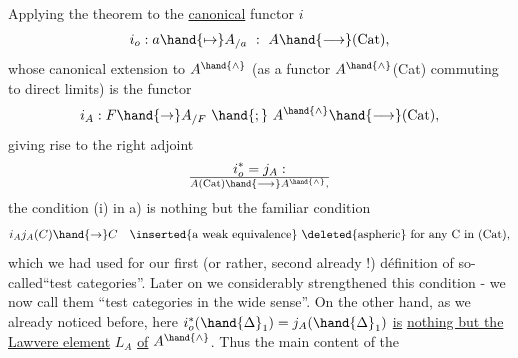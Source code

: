 Applying the theorem to the \uline{canonical} functor $i$
\[ i_o : a \hand{\ensuremath{\mapsto}} A_{/a} \ : \ A \hand{\ensuremath{\longrightarrow}} \text{(Cat)} , \]
whose canonical extension to $A^{\hand{\wedge}}$ (as a functor $A^{\hand{\wedge}}$\hand{\ensuremath{\to}}(Cat) commuting to
direct limits) is the functor 
\[ i_A : F \hand{\ensuremath{\to}} A_{/F} \ \hand{;} \ A^{\hand{\wedge}} \hand{\ensuremath{\longrightarrow}} \text{(Cat)} , \]
giving rise to the right adjoint
\[ i_o^{*} = j_A : \over{A}{(}\text{Cat)} \hand{\ensuremath{\longrightarrow}} A^{\hand{\wedge}} , \]
the condition (i) in a) is nothing but the familiar condition
\[ i_A j_A(C) \hand{\ensuremath{\to}} C \quad \text{\inserted{a weak equivalence} \deleted{aspheric} for any C in (Cat)} , \]
which we had used for our first (or rather, second already !) définition
of so-called``test categories''. Later on we considerably strengthened this
condition - we now call them ``test categories in the wide sense''. On 
the other hand, as we already noticed before, here $i_o^{*}(\hand{\ensuremath{\Delta}}_1) = j_A(\hand{\ensuremath{\Delta}}_1)$ \uline{is}
\uline{nothing but the Lawvere element} $L_A$ \uline{of} $A^{\hand{\wedge}}$. Thus the main content of the
